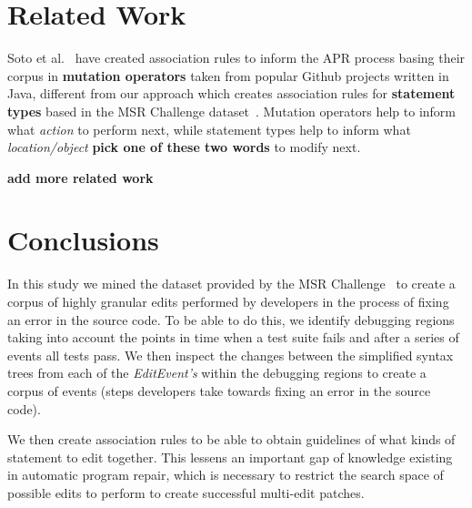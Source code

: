 \documentclass[sigconf]{acmart}
\newcommand{\todo}[1]
  {{\scriptsize \textbf{\color{red} {#1}}}}
\begin{document}
\section{Related Work}
\label{relWork}
Soto et al.~\cite{Soto18} have created association rules to inform the APR
process basing their corpus in \textbf{mutation operators} taken from popular Github projects
written in Java, 
different from our approach which creates association rules for \textbf{statement types} 
based in the MSR Challenge dataset~\cite{msr18challenge}. Mutation operators help to 
inform what \textit{action} to perform next, while statement types help to inform what
\textit{location/object}\todo{pick one of these two words} to modify next. 

\todo{add more related work}

\section{Conclusions}
\label{conclusions}
In this study we mined the dataset provided by the MSR Challenge~\cite{msr18challenge}
to create a corpus of highly granular edits performed by developers in the process
of fixing an error in the source code. To be able to do this, we identify debugging
regions taking into account the points in time when a test suite fails and after a 
series of events all tests pass. We then inspect the changes between the simplified 
syntax trees from each
of the \textit{EditEvent's} within the debugging regions to create a corpus of 
events (steps developers take towards fixing an error in the source code).

We then create association rules to be able to obtain guidelines of what kinds of
statement to edit together. This lessens an important gap of knowledge existing
in automatic program repair, which is necessary to restrict the search space of 
possible edits to perform to create successful multi-edit patches.
\end{document}
